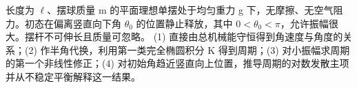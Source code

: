 长度为 \(\ell \)、摆球质量 m 的平面理想单摆处于均匀重力 g 下，无摩擦、无空气阻力。初态在偏离竖直向下角 \(\theta _{0}\) 的位置静止释放，其中 \(0<\theta _{0}<\pi \)，允许振幅很大。摆杆不可伸长且质量可忽略。
(1) 直接由总机械能守恒得到角速度与角度的关系；(2) 作半角代换，利用第一类完全椭圆积分 K 得到周期；(3) 对小振幅求周期的第一个非线性修正；(4) 对初始角趋近竖直向上位置，推导周期的对数发散主项并从不稳定平衡解释这一结果。

